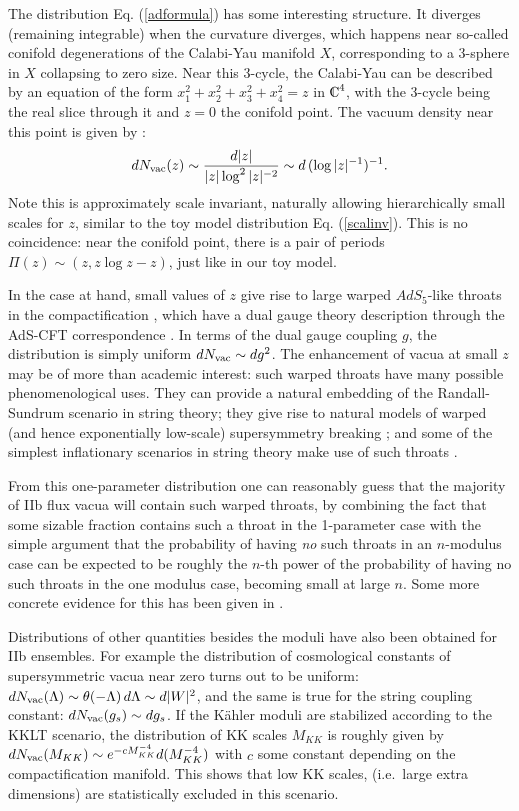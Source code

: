 \documentclass[aps,amsfonts]{ar2e}
\begin{document}
The distribution Eq. (\ref{adformula}) has some interesting structure.
It diverges (remaining integrable) when the curvature diverges,
which happens near so-called conifold degenerations of the
Calabi-Yau manifold $X$, corresponding to a 3-sphere in $X$
collapsing to zero size. Near this 3-cycle, the Calabi-Yau can be
described by an equation of the form $x_1^2 + x_2^2 + x_3^2 + x_4^2
= z$ in $\IC^4$, with the 3-cycle being the real slice through it
and $z=0$ the conifold point. The vacuum density near this point is
given by \cite{Denef:2004ze}:
\begin{equation} \label{conifdistr}
 dN_{\rm vac}(z)
 \sim \frac{d |z|}{|z| \log^2|z|^{-2}} \sim d \, (\log |z|^{-1})^{-1}.
\end{equation}
Note this is approximately scale invariant, naturally allowing
hierarchically small scales for $z$, similar to the toy model
distribution Eq. (\ref{scalinv}). This is no coincidence: near the
conifold point, there is a pair of periods $\Pi(z) \sim (z,z \log z
- z)$, just like in our toy model.

In the case at hand, small values of $z$ give rise to large warped
$AdS_5$-like throats in the compactification \cite{Giddings:2001yu},
which have a dual gauge theory description through the AdS-CFT
correspondence \cite{Klebanov:2000hb}.
In terms of the dual gauge coupling $g$, the distribution is simply
uniform $dN_{\rm vac} \sim dg^2$.
The enhancement of vacua at small $z$ may be of more than
academic interest:
such warped throats have many possible phenomenological uses.
They can provide a natural
embedding of the Randall-Sundrum scenario
\cite{Randall:1999ee} in string theory;
they give rise to natural models of warped (and hence exponentially
low-scale) supersymmetry breaking
\cite{Kachru:2002gs}; and some of the simplest inflationary scenarios in
string theory make use of such throats \cite{Kachru:2003sx}.


From this one-parameter distribution one can reasonably guess that
the majority of IIb flux vacua will contain such warped throats, by
combining the fact that some sizable fraction contains such a throat
in the 1-parameter case with the simple argument that the
probability of having \emph{no} such throats in an $n$-modulus case
can be expected to be roughly the $n$-th power of the probability of
having no such throats in the one modulus case, becoming small at
large $n$. Some more concrete evidence for this has been given in
\cite{Hebecker:2006bn}.

Distributions of other quantities besides the moduli have also been
obtained for IIb ensembles. For example the distribution of
cosmological constants of supersymmetric vacua near zero turns out
to be uniform: $d N_{\rm vac}(\Lambda) \sim \theta(-\Lambda) \,
d\Lambda \sim d|W|^2$, and the same is true for the string coupling
constant: $dN_{\rm vac}(g_s) \sim dg_s$. If the K\"ahler moduli are
stabilized according to the KKLT scenario, the distribution of KK
scales $M_{KK}$ is roughly given by $d N_{\rm vac}(M_{KK}) \sim
e^{-c M_{KK}^{-4}} d(M_{KK}^{-4})$ with $c$ some constant depending
on the compactification manifold. This shows that low KK scales,
(i.e.\ large extra dimensions) are statistically excluded in this
scenario.
\end{document}
